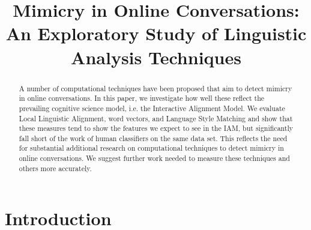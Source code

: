 \documentclass[conference]{IEEEtran}
\begin{document}
\IEEEoverridecommandlockouts 
{} 


\title{Mimicry in Online Conversations: An Exploratory Study of Linguistic Analysis Techniques}
\author{
}

\maketitle

\begin{abstract}
A number of computational techniques have been proposed that aim to detect mimicry in online conversations. In this paper, we investigate how well these reflect the prevailing cognitive science model, i.e. the Interactive Alignment Model. We evaluate Local Linguistic Alignment, word vectors, and Language Style Matching and show that these measures tend to show the features we expect to see in the IAM, but significantly fall short of the work of human classifiers on the same data set. This reflects the need for substantial additional research on computational techniques to detect mimicry in online conversations. We suggest further work needed to measure these techniques and others more accurately.

\end{abstract}


\IEEEpeerreviewmaketitle


\section{Introduction}
\end{document}
